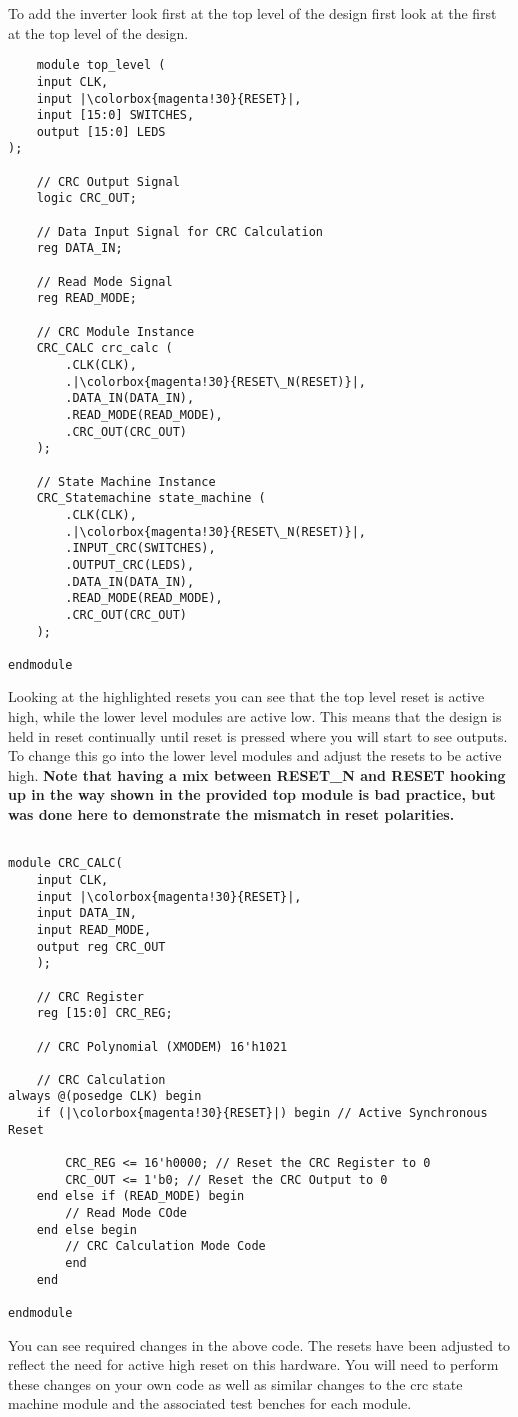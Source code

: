 

To add the inverter look first at the top level of the design first look at the first at the top level of the design. 
\begin{lstlisting}
    module top_level (
    input CLK,
    input |\colorbox{magenta!30}{RESET}|,
    input [15:0] SWITCHES,
    output [15:0] LEDS
);
 
    // CRC Output Signal
    logic CRC_OUT;

    // Data Input Signal for CRC Calculation
    reg DATA_IN;
    
    // Read Mode Signal
    reg READ_MODE;

    // CRC Module Instance
    CRC_CALC crc_calc (
        .CLK(CLK),
        .|\colorbox{magenta!30}{RESET\_N(RESET)}|,
        .DATA_IN(DATA_IN),
        .READ_MODE(READ_MODE),
        .CRC_OUT(CRC_OUT)
    );

    // State Machine Instance
    CRC_Statemachine state_machine (
        .CLK(CLK),
        .|\colorbox{magenta!30}{RESET\_N(RESET)}|,
        .INPUT_CRC(SWITCHES),
        .OUTPUT_CRC(LEDS),
        .DATA_IN(DATA_IN),
        .READ_MODE(READ_MODE),
        .CRC_OUT(CRC_OUT)
    );

endmodule

\end{lstlisting}
Looking at the highlighted resets you can see that the top level reset is active high, while the lower level modules are active low. This means that the design is held in reset continually until reset is pressed where you will start to see outputs. To change this go into the lower level modules and adjust the resets to be active high. \textbf{\*Note that having a mix between RESET\_N and RESET hooking up in the way shown in the provided top module is bad practice, but was done here to demonstrate the mismatch in reset polarities.}\\
\vspace{0.5cm}
\begin{lstlisting}
    
module CRC_CALC(
    input CLK,
    input |\colorbox{magenta!30}{RESET}|,
    input DATA_IN,
    input READ_MODE,
    output reg CRC_OUT
    );
    
    // CRC Register
    reg [15:0] CRC_REG;
    
    // CRC Polynomial (XMODEM) 16'h1021
    
    // CRC Calculation
always @(posedge CLK) begin
    if (|\colorbox{magenta!30}{RESET}|) begin // Active Synchronous Reset
    
        CRC_REG <= 16'h0000; // Reset the CRC Register to 0
        CRC_OUT <= 1'b0; // Reset the CRC Output to 0
    end else if (READ_MODE) begin
        // Read Mode COde
    end else begin                                             
        // CRC Calculation Mode Code
        end
    end
 
endmodule

\end{lstlisting}
You can see required changes in the above code. The resets have been adjusted to reflect the need for active high reset on this hardware. You will need to perform these changes on your own code as well as similar changes to the crc state machine module and the associated test benches for each module. 
